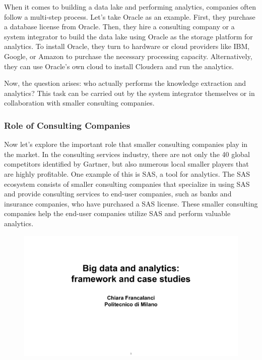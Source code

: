 When it comes to building a data lake and performing analytics,
companies often follow a multi-step process. Let's take Oracle as an
example. First, they purchase a database license from Oracle. Then, they
hire a consulting company or a system integrator to build the data lake
using Oracle as the storage platform for analytics. To install Oracle,
they turn to hardware or cloud providers like IBM, Google, or Amazon to
purchase the necessary processing capacity. Alternatively, they can use
Oracle's own cloud to install Cloudera and run the analytics.

Now, the question arises: who actually performs the knowledge extraction
and analytics? This task can be carried out by the system integrator
themselves or in collaboration with smaller consulting companies.

\subsubsection{Role of Consulting Companies}

Now let's explore the important role that smaller consulting companies
play in the market. In the consulting services industry, there are not
only the 40 global competitors identified by Gartner, but also numerous
local smaller players that are highly profitable. One example of this is
SAS, a tool for analytics. The SAS ecosystem consists of smaller
consulting companies that specialize in using SAS and provide consulting
services to end-user companies, such as banks and insurance companies,
who have purchased a SAS license. These smaller consulting companies
help the end-user companies utilize SAS and perform valuable analytics.

\begin{figure}[!h]
  \centering
  \includegraphics[page=61, trim = 1cm 3cm 1cm 4cm, clip, width=\imagewidth]{images/06 - BIG_DATA.pdf}
\end{figure}

